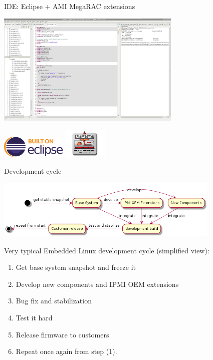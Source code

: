 \documentclass{beamer}
\begin{document}
  \begin{frame}{IDE: Eclipse + AMI MegaRAC extensions}
	  \begin{center}
		  \includegraphics[width=250pt]{screenshot/ide-screenshot.png}
	  \end{center}
	  \includegraphics[height=30pt]{logo/eclipse-mp-built.png}
	  \includegraphics[height=40pt]{logo/megarac-development-studio.png}
  \end{frame}
  

  \begin{frame}{Development cycle}

	  \begin{center}
		  \includegraphics[height=80pt]{diagrams/embedded-release-cycle.png}
	  \end{center}

	  Very typical Embedded Linux development cycle (simplified view):
	  \begin{enumerate}
		  \item Get base system snapshot and freeze it
		  \item Develop new components and IPMI OEM extensions
		  \item Bug fix and stabilization
		  \item Test it hard
		  \item Release firmware to customers
		  \item Repeat once again from step  (1).
	  \end{enumerate}
  \end{frame}
\end{document}
